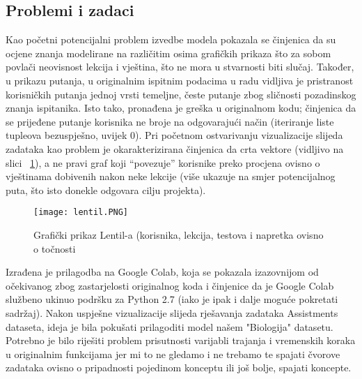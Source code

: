 \subsection{Problemi i zadaci}
Kao početni potencijalni problem izvedbe modela pokazala se činjenica da su ocjene znanja modelirane na različitim osima grafičkih prikaza što za sobom povlači neovisnost lekcija i vještina, što ne mora u stvarnosti biti slučaj. Također, u prikazu putanja, u originalnim ispitnim podacima u radu vidljiva je pristranost korisničkih putanja jednoj vrsti temeljne, česte putanje zbog sličnosti pozadinskog znanja ispitanika.\newline
Isto tako, pronađena je greška u originalnom kodu; činjenica da se prijeđene putanje korisnika ne broje na odgovarajući način (iteriranje liste tupleova bezuspješno, uvijek 0).\newline
Pri početnom ostvarivanju vizualizacije slijeda zadataka kao problem je okarakterizirana činjenica da crta vektore (vidljivo na slici ~\ref{fig:lentil}), a ne pravi graf koji “povezuje” korisnike preko procjena ovisno o vještinama dobivenih nakon neke lekcije (više ukazuje na smjer potencijalnog puta, što isto donekle odgovara cilju projekta).\newline 

\begin{figure}[!htb]
\centering
\texttt{[image: lentil.PNG]}
\caption{Grafički prikaz Lentil-a (korisnika, lekcija, testova i napretka ovisno o točnosti \citep{lentil}}
\label{fig:lentil}
\end{figure}
Izrađena je prilagodba na Google Colab, koja se pokazala izazovnijom od očekivanog zbog zastarjelosti originalnog koda i činjenice da je Google Colab službeno ukinuo podršku za Python 2.7 (iako je ipak i dalje moguće pokretati sadržaj).\newline
Nakon uspješne vizualizacije slijeda rješavanja zadataka Assistments dataseta, ideja je bila pokušati prilagoditi model našem "Biologija" datasetu. Potrebno je bilo riješiti problem prisutnosti varijabli trajanja i vremenskih koraka u originalnim funkcijama jer mi to ne gledamo i ne trebamo te spajati čvorove zadataka ovisno o pripadnosti pojedinom konceptu ili još bolje, spajati koncepte. 


